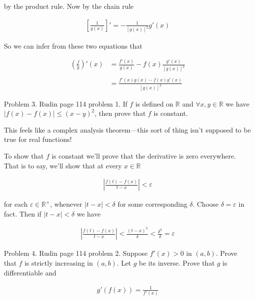 \documentclass{article}
\begin{document}
  by the product rule.  Now by the chain rule

  \begin{align*}
    \left[\frac 1 {g(x)} \right]' = -\frac{1}{[g(x)]^2}g'(x)
  \end{align*}

  So we can infer from these two equations that

  \begin{align*}
    \left(\frac f g \right)'(x) &= \frac{f'(x)}{g(x)}-f(x)\frac{g'(x)}{[g(x)]^2} \\\\
    &= \frac{f'(x)g(x)-f(x)g'(x)}{[g(x)]^2}
  \end{align*}

  \pagebreak

  {\Large \color{Sepia} Problem 3. Rudin page 114 problem 1. If $f$ is defined on $\mathbb R$ and $\forall x,y \in \mathbb R$ we have $|f(x)-f(x)|\leq (x-y)^2$, then prove that $f$ is constant.}

  \vspace{1cm}

  This feels like a complex analysis theorem---this sort of thing isn't supposed to be true for real functions! \smiley{}

  To show that $f$ is constant we'll prove that the derivative is zero everywhere.  That is to say, we'll show that at every $x\in \mathbb R$

  \begin{align*}
    \left|\frac{f(t)-f(x)}{t-x}\right| < \varepsilon
  \end{align*}

  for each $\varepsilon\in\mathbb R^+$, whenever $|t-x|<\delta$ for some corresponding $\delta$.  Choose $\delta = \varepsilon$ in fact.  Then if $|t-x| < \delta$ we have

  \begin{align*}
    \left|\frac{f(t)-f(x)}{t-x}\right|<\frac{(t-x)^2}{\delta} < \frac{\delta^2}{\delta} = \varepsilon
  \end{align*}

  \pagebreak

  {\Large \color{Sepia} Problem 4. Rudin page 114 problem 2. Suppose $f'(x)>0$ in $(a,b)$.  Prove that $f$ is strictly increasing in $(a,b)$.  Let $g$ be its inverse.  Prove that $g$ is differentiable and

  \begin{align*}
    g'(f(x)) = \frac{1}{f'(x)}
  \end{align*}
  }
\end{document}
